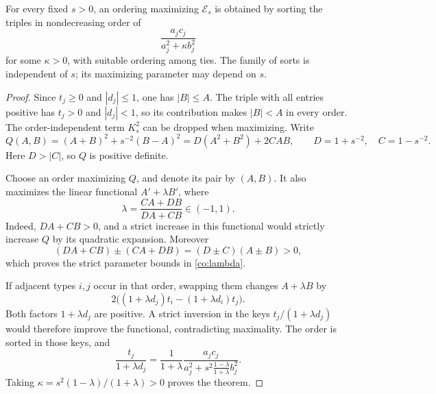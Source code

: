 \begin{theorem}\label{co:sorting}
For every fixed \(s>0\), an ordering maximizing \(\mathcal E_s\)
is obtained by sorting the triples in nondecreasing order of
\begin{equation}\label{co:keys}
 \frac{a_jc_j}{a_j^2+\kappa b_j^2}
\end{equation}
for some \(\kappa>0\), with suitable ordering among ties. The
family of sorts is independent of \(s\); its maximizing parameter
may depend on \(s\).
\end{theorem}
\begin{proof}
Since \(t_j\ge0\) and \(|d_j|\le1\), one has \(|B|\le A\).
The triple with all entries positive has \(t_j>0\) and
\(|d_j|<1\), so its contribution makes \(|B|<A\) in every order.
The order-independent term \(K_s^2\) can be dropped when maximizing.
Write
\[
 Q(A,B)=(A+B)^2+s^{-2}(B-A)^2
       =D(A^2+B^2)+2CAB,
 \qquad D=1+s^{-2},\quad C=1-s^{-2}.
\]
Here \(D>|C|\), so \(Q\) is positive definite.

Choose an order maximizing \(Q\), and denote its pair by \((A,B)\).
It also maximizes the linear functional \(A'+\lambda B'\), where
\begin{equation}\label{co:lambda}
 \lambda=\frac{CA+DB}{DA+CB}\in(-1,1).
\end{equation}
Indeed, \(DA+CB>0\), and a strict increase in this functional
would strictly increase \(Q\) by its quadratic expansion.
Moreover
\[
 (DA+CB)\mathbin\pm(CA+DB)=(D\pm C)(A\pm B)>0,
\]
which proves the strict parameter bounds in \eqref{co:lambda}.

If adjacent types \(i,j\) occur in that order, swapping them changes
\(A+\lambda B\) by
\[
 2\bigl((1+\lambda d_j)t_i-(1+\lambda d_i)t_j\bigr).
\]
Both factors \(1+\lambda d_j\) are positive. A strict inversion
in the keys \(t_j/(1+\lambda d_j)\) would therefore improve the
functional, contradicting maximality. The order is sorted in those
keys, and
\[
 \frac{t_j}{1+\lambda d_j}
 =\frac1{1+\lambda}
   \frac{a_jc_j}
        {a_j^2+s^2\frac{1-\lambda}{1+\lambda}b_j^2}.
\]
Taking \(\kappa=s^2(1-\lambda)/(1+\lambda)>0\) proves the theorem.
\end{proof}


